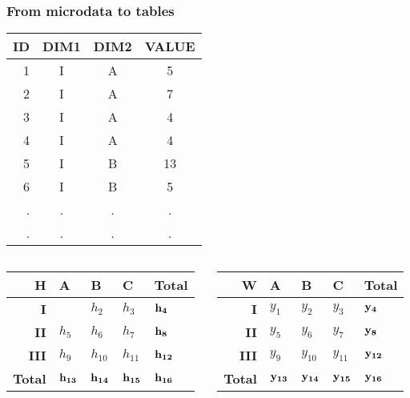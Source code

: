 \begin{frame}\frametitle{From microdata to tables}
	\vspace{-0.2cm}
	\begin{center}
	\begin{tabular}{|r|ccc|}
	\hline
	{\bf ID} & {\bf DIM1} & {\bf DIM2} & {\bf VALUE}  \\ \hline
	1 & I & A & 5 \\ 
	2 & I & A & 7 \\ 
	3 & I & A & 4 \\	
	4 & I & A & 4 \\
	5 & I & B & 13 \\ 
	6 & I & B & 5 \\ 	
	. & . & . & . \\ 	
	. & . & . & . \\ 			
	\hline
	\end{tabular}
	\end{center}
	
	\vspace{-1cm}
	
	\begin{columns}
	\begin{column}{5cm}
		\begin{center}
			\begin{tabular}{|r|lll|l|}
			\hline
			{\bf H} & {\bf A} & {\bf B} & {\bf C} & {\bf Total} \\ 
			\hline
			{\bf I} & \cbw{$h_1$} & $h_2$ & $h_3$ & $\mathbf{h_4}$ \\ 
			{\bf II} & $h_5$ & $h_6$ & $h_7$ & $\mathbf{h_8}$ \\ 
			{\bf III} & $h_9$ & $h_{10}$ & $h_{11}$ & $\mathbf{h_{12}}$ \\ 
			\hline
			{\bf Total} & $\mathbf{h_{13}}$ & $\mathbf{h_{14}}$ & $\mathbf{h_{15}}$ & $\mathbf{h_{16}}$ \\
			\hline
			\end{tabular}
		\end{center}		
	\end{column}
	\begin{column}{5cm}
		\begin{center}
			\begin{tabular}{|r|lll|l|}
			\hline
			{\bf W} & {\bf A} & {\bf B} & {\bf C} & {\bf Total} \\ 
			\hline
			{\bf I} & $y_1$ & $y_2$ & $y_3$ & $\mathbf{y_4}$ \\ 
			{\bf II} & $y_5$ & $y_6$ & $y_7$ & $\mathbf{y_8}$ \\ 
			{\bf III} & $y_9$ & $y_{10}$ & $y_{11}$ & $\mathbf{y_{12}}$ \\ 
			\hline
			{\bf Total} & $\mathbf{y_{13}}$ & $\mathbf{y_{14}}$ & $\mathbf{y_{15}}$ & $\mathbf{y_{16}}$ \\
			\hline
			\end{tabular}
		\end{center}			
		\end{column}
	\end{columns}
\end{frame}

